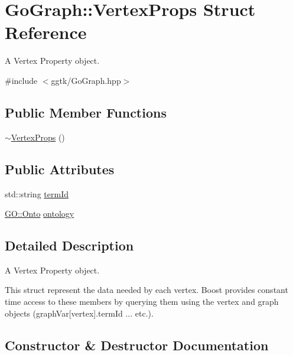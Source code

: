 \hypertarget{structGoGraph_1_1VertexProps}{}\section{Go\+Graph\+:\+:Vertex\+Props Struct Reference}
\label{structGoGraph_1_1VertexProps}


A Vertex Property object.  




{\ttfamily \#include $<$ggtk/\+Go\+Graph.\+hpp$>$}

\subsection*{Public Member Functions}
\begin{DoxyCompactItemize}
\item 
\hyperlink{structGoGraph_1_1VertexProps_ad60aea44237ee479a4c8768226778590}{$\sim$\+Vertex\+Props} ()
\end{DoxyCompactItemize}
\subsection*{Public Attributes}
\begin{DoxyCompactItemize}
\item 
std\+::string \hyperlink{structGoGraph_1_1VertexProps_a9f3a3e42785bc040b0b827b1ffd3f039}{term\+Id}
\item 
\hyperlink{namespaceGO_a5ae335887b5cf40a9ef3045be9247fc3}{G\+O\+::\+Onto} \hyperlink{structGoGraph_1_1VertexProps_a353631ac064161688da0fb4f458dfcb8}{ontology}
\end{DoxyCompactItemize}


\subsection{Detailed Description}
A Vertex Property object. 

This struct represent the data needed by each vertex. Boost provides constant time access to these members by querying them using the vertex and graph objects (graph\+Var\mbox{[}vertex\mbox{]}.term\+Id ... etc.). 

\subsection{Constructor \& Destructor Documentation}
